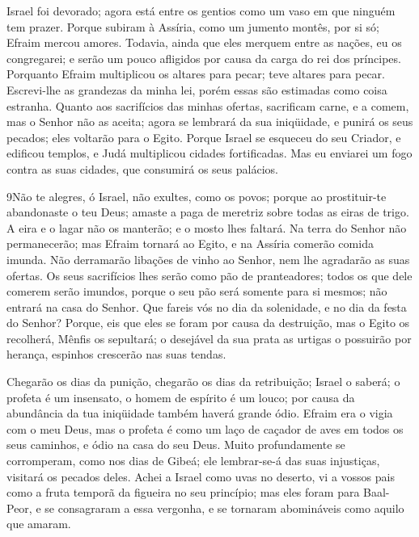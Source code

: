 Israel foi devorado; agora está entre os gentios como um vaso em
que ninguém tem prazer. Porque subiram à Assíria, como um
jumento montês, por si só; Efraim mercou amores. Todavia,
ainda que eles merquem entre as nações, eu os congregarei; e serão
um pouco afligidos por causa da carga do rei dos príncipes.
Porquanto Efraim multiplicou os altares para pecar; teve
altares para pecar. Escrevi-lhe as grandezas da minha lei,
porém essas são estimadas como coisa estranha. Quanto aos
sacrifícios das minhas ofertas, sacrificam carne, e a comem, mas o
Senhor não as aceita; agora se lembrará da sua iniqüidade, e punirá
os seus pecados; eles voltarão para o Egito. Porque Israel se
esqueceu do seu Criador, e edificou templos, e Judá multiplicou
cidades fortificadas. Mas eu enviarei um fogo contra as suas
cidades, que consumirá os seus palácios.

\medskip

\lettrine{9} Não te alegres, ó Israel, não exultes, como os
povos; porque ao prostituir-te abandonaste o teu Deus; amaste a paga
de meretriz sobre todas as eiras de trigo. A eira e o lagar não
os manterão; e o mosto lhes faltará. Na terra do Senhor não
permanecerão; mas Efraim tornará ao Egito, e na Assíria comerão
comida imunda. Não derramarão libações de vinho ao Senhor, nem
lhe agradarão as suas ofertas. Os seus sacrifícios lhes serão como
pão de pranteadores; todos os que dele comerem serão imundos, porque
o seu pão será somente para si mesmos; não entrará na casa do
Senhor. Que fareis vós no dia da solenidade, e no dia da festa
do Senhor? Porque, eis que eles se foram por causa da
destruição, mas o Egito os recolherá, Mênfis os sepultará; o
desejável da sua prata as urtigas o possuirão por herança, espinhos
crescerão nas suas tendas.

Chegarão os dias da punição, chegarão os dias da retribuição;
Israel o saberá; o profeta é um insensato, o homem de espírito é um
louco; por causa da abundância da tua iniqüidade também haverá
grande ódio. Efraim era o vigia com o meu Deus, mas o profeta é
como um laço de caçador de aves em todos os seus caminhos, e ódio na
casa do seu Deus. Muito profundamente se corromperam, como nos
dias de Gibeá; ele lembrar-se-á das suas injustiças, visitará os
pecados deles. Achei a Israel como uvas no deserto, vi a
vossos pais como a fruta temporã da figueira no seu princípio; mas
eles foram para Baal-Peor, e se consagraram a essa vergonha, e se
tornaram abomináveis como aquilo que amaram.

